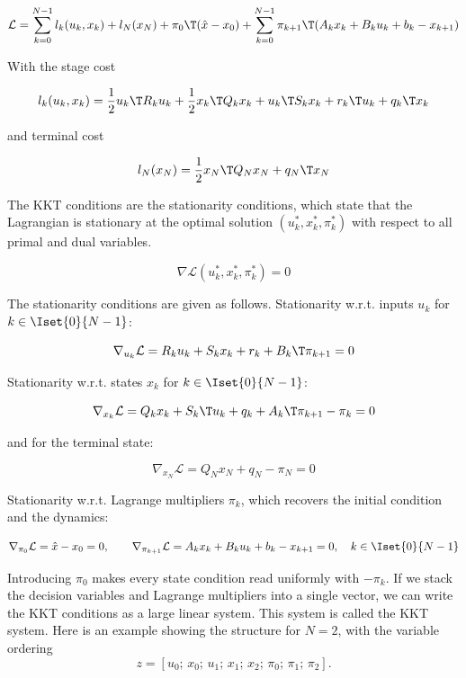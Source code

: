 \[
\mathcal{L} = \sum_{k=0}^{N-1} l_k(u_k, x_k) + l_N(x_N) + \pi_0\T (\hat{x} - x_0) + \sum_{k=0}^{N-1} \pi_{k+1}\T (A_k x_k + B_k u_k + b_k - x_{k+1})
\]

With the stage cost

\[
l_k(u_k, x_k) = \frac{1}{2} u_k\T R_k u_k + \frac{1}{2} x_k\T Q_k x_k + u_k\T S_k x_k + r_k\T u_k + q_k\T x_k
\]

and terminal cost

\[
l_N(x_N) = \frac{1}{2} x_N\T Q_N x_N + q_N\T x_N
\]

The KKT conditions are the stationarity conditions, which state that the Lagrangian is stationary at the optimal solution $(u_k^*, x_k^*, \pi_k^*)$ with respect to all primal and dual variables.

\[
\nabla \mathcal{L}(u_k^*, x_k^*, \pi_k^*) = 0
\]

The stationarity conditions are given as follows.
Stationarity w.r.t. inputs $u_k$ for $k\in\Iset{0}{N-1}$:

\[ 
\nabla_{u_k} \mathcal{L} = R_k u_k + S_k x_k + r_k + B_k\T \pi_{k+1} = 0
\]

Stationarity w.r.t. states $x_k$ for $k\in\Iset{0}{N-1}$:

\[
\nabla_{x_k} \mathcal{L} = Q_k x_k + S_k\T u_k + q_k + A_k\T \pi_{k+1} - \pi_k = 0
\]

and for the terminal state:

\[
\nabla_{x_N} \mathcal{L} = Q_N x_N + q_N - \pi_N = 0
\]

Stationarity w.r.t. Lagrange multipliers $\pi_k$, which recovers the initial condition and the dynamics:

\[
\nabla_{\pi_0} \mathcal{L} = \hat{x} - x_0 = 0, \qquad
\nabla_{\pi_{k+1}} \mathcal{L} = A_k x_k + B_k u_k + b_k - x_{k+1} = 0, \quad k\in\Iset{0}{N-1}
\]

Introducing $\pi_0$ makes every state condition read uniformly with $-\pi_k$.
If we stack the decision variables and Lagrange multipliers into a single vector, we can write the KKT conditions as a large linear system.
This system is called the KKT system.
Here is an example showing the structure for $N=2$, with the variable ordering
\[
z = [u_0;\, x_0;\, u_1;\, x_1;\, x_2;\, \pi_0;\, \pi_1;\, \pi_2].
\]


